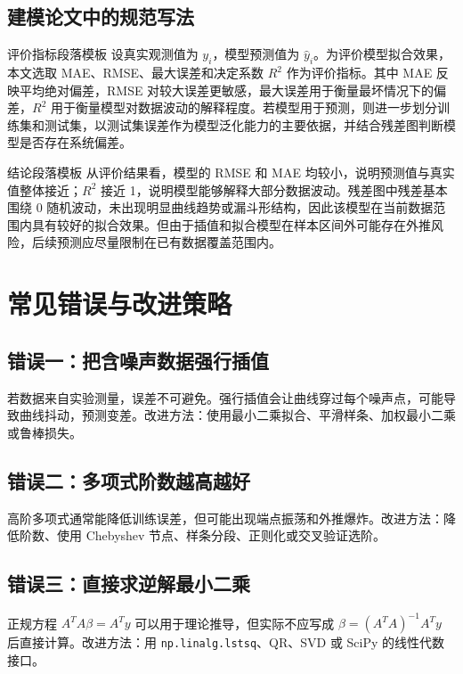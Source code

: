 \documentclass[11pt,a4paper]{ctexart}
\begin{document}
\subsection{建模论文中的规范写法}

\begin{stepbox}{评价指标段落模板}
设真实观测值为 $y_i$，模型预测值为 $\hat y_i$。为评价模型拟合效果，本文选取 MAE、RMSE、最大误差和决定系数 $R^2$ 作为评价指标。其中 MAE 反映平均绝对偏差，RMSE 对较大误差更敏感，最大误差用于衡量最坏情况下的偏差，$R^2$ 用于衡量模型对数据波动的解释程度。若模型用于预测，则进一步划分训练集和测试集，以测试集误差作为模型泛化能力的主要依据，并结合残差图判断模型是否存在系统偏差。
\end{stepbox}

\begin{stepbox}{结论段落模板}
从评价结果看，模型的 RMSE 和 MAE 均较小，说明预测值与真实值整体接近；$R^2$ 接近 1，说明模型能够解释大部分数据波动。残差图中残差基本围绕 0 随机波动，未出现明显曲线趋势或漏斗形结构，因此该模型在当前数据范围内具有较好的拟合效果。但由于插值和拟合模型在样本区间外可能存在外推风险，后续预测应尽量限制在已有数据覆盖范围内。
\end{stepbox}

\newpage
\section{常见错误与改进策略}

\subsection{错误一：把含噪声数据强行插值}

若数据来自实验测量，误差不可避免。强行插值会让曲线穿过每个噪声点，可能导致曲线抖动，预测变差。改进方法：使用最小二乘拟合、平滑样条、加权最小二乘或鲁棒损失。

\subsection{错误二：多项式阶数越高越好}

高阶多项式通常能降低训练误差，但可能出现端点振荡和外推爆炸。改进方法：降低阶数、使用 Chebyshev 节点、样条分段、正则化或交叉验证选阶。

\subsection{错误三：直接求逆解最小二乘}

正规方程 $A^TA\beta=A^Ty$ 可以用于理论推导，但实际不应写成 $\beta=(A^TA)^{-1}A^Ty$ 后直接计算。改进方法：用 \verb|np.linalg.lstsq|、QR、SVD 或 SciPy 的线性代数接口。
\end{document}
